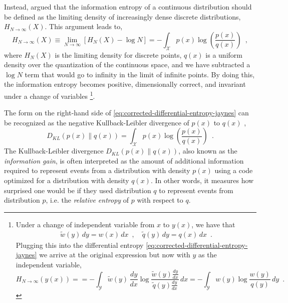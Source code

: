 Instead, \textcite{jaynes_information_1957,jaynes_prior_1968} argued that the information entropy of a continuous distribution should be defined as the limiting density of increasingly dense discrete distributions, $H_{N\rightarrow\infty}(X)$. This argument leads to,
%
\begin{equation} \label{eq:corrected-differential-entropy-jaynes}
    H_{N\rightarrow\infty}(X) \equiv \lim_{N\rightarrow\infty} [H_{N}(X) - \log N] = - \int_\mathcal{X} p(x) \log \left(\frac{p(x)}{q(x)}\right) \enspace ,
\end{equation}
%
where $H_N(X)$ is the limiting density for discrete points, $q(x)$ is a uniform density over the quantization of the continuous space, and we have subtracted a $\log N$ term that would go to infinity in the limit of infinite points.
By doing this, the information entropy becomes positive, dimensionally correct, and invariant under a change of variables%
\footnote{\label{fn:change-of-variables-invariance-of-corrected-differential-entropy}
    Under a change of independent variable from $x$ to $y(x)$, we have that
    \begin{align*}
        \widetilde{w}(y)\,dy = w(x)\,dx \enspace , \quad
        \widetilde{q}(y)\,dy = q(x)\,dx \enspace .
    \end{align*}
    Plugging this into the differential entropy \cref{eq:corrected-differential-entropy-jaynes} we arrive at the original expression but now with $y$ as the independent variable,
    \begin{equation*}
        H_{N\rightarrow\infty}(y(x)) =  = - \int_\mathcal{Y} \widetilde{w}(y)\,\frac{dy}{dx} \log \frac{\widetilde{w}(y)\frac{dy}{dx}}{\widetilde{q}(y)\frac{dy}{dx}} \, dx = - \int_\mathcal{Y} w(y) \log \frac{w(y)}{q(y)} \, dy \enspace .
    \end{equation*}
}.

The form on the right-hand side of \cref{eq:corrected-differential-entropy-jaynes} can be recognized as the negative Kullback-Leibler divergence of $p(x)$ to $q(x)$ \parencite{kullback_information_1959},
%
\begin{equation} \label{eq:kullback-leibler-divergence}
    D_{KL}(p(x)\parallel q(x)) = \int_\mathcal{X} p(x) \log \left(\frac{p(x)}{q(x)}\right) \enspace .
\end{equation}
%
The Kullback-Leibler divergence $D_{KL}(p(x)\parallel q(x))$, also known as the \emph{information gain}, is often interpreted as the amount of additional information required to represent events from a distribution with density $p(x)$ using a code optimized for a distribution with density $q(x)$. In other words, it measures how surprised one would be if they used distribution $q$ to represent events from distribution $p$, i.e. the \emph{relative entropy} of $p$ with respect to $q$.

